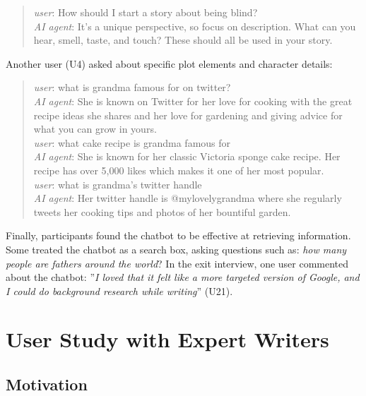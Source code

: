 \begin{quote}
    {\color{blue}\textit{user}:} How should I start a story about being blind?\\
    {\color{blue}\textit{AI agent}:} It's a unique perspective, so focus on description. What can you hear, smell, taste, and touch? These should all be used in your story.
\end{quote}

\noindent Another user (U4) asked about specific plot elements and character details:

\begin{quote}
    {\color{blue}\textit{user}:} what is grandma famous for on twitter?\\
    {\color{blue}\textit{AI agent}:} She is known on Twitter for her love for cooking with the great recipe ideas she shares and her love for gardening and giving advice for what you can grow in yours.\\
    {\color{blue}\textit{user}:} what cake recipe is grandma famous for\\
    {\color{blue}\textit{AI agent}:} She is known for her classic Victoria sponge cake recipe. Her recipe has over 5,000 likes which makes it one of her most popular.\\
    {\color{blue}\textit{user}:} what is grandma's twitter handle\\
    {\color{blue}\textit{AI agent}:} Her twitter handle is @mylovelygrandma where she regularly tweets her cooking tips and photos of her bountiful garden.
\end{quote}

Finally, participants found the chatbot to be effective at retrieving information. Some treated the chatbot as a search box, asking questions such as: \textit{how many people are fathers around the world}? In the exit interview, one user commented about the chatbot: ''\textit{I loved that it felt like a more targeted version of Google, and I could do background research while writing}'' (U21).

\section{User Study with Expert Writers}


\subsection{Motivation}

